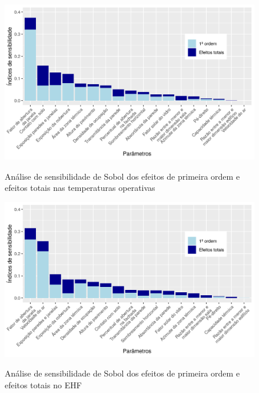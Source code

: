 \documentclass[brazil,hardcopy,openany]{ufscthesis} %
\newcommand{\sasize}{1}
\begin{document}
\begin{figure}[H]
	\centering
	\caption{Análise de sensibilidade de Sobol dos efeitos de primeira ordem e efeitos totais nas temperaturas operativas}
	\includegraphics[width=\sasize\linewidth]{img/as_temp.png}
	\label{fig:as_temp}
\end{figure}

\begin{figure}[H]
	\centering
	\caption{Análise de sensibilidade de Sobol dos efeitos de primeira ordem e efeitos totais no EHF}
	\includegraphics[width=\sasize\linewidth]{img/as_ehf.png}
	\label{fig:as_ehf}
\end{figure}
\end{document}
